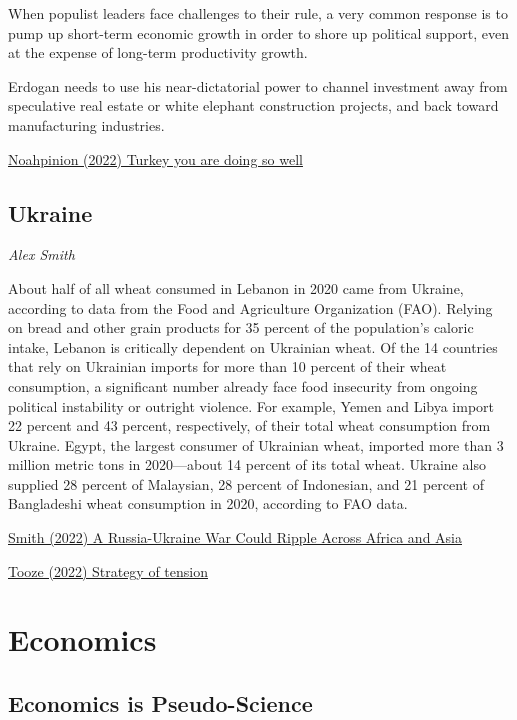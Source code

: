 \documentclass[
]{book}
\begin{document}
When populist leaders face challenges to their rule, a very common response is to pump up short-term economic growth in order to shore up political support, even at the expense of long-term productivity growth.

Erdogan needs to use his near-dictatorial power to channel investment away from speculative real estate or white elephant construction projects, and back toward manufacturing industries.

\href{https://noahpinion.substack.com/p/turkey-you-were-doing-so-well}{Noahpinion (2022) Turkey you are doing so well}

\hypertarget{ukraine}{%
\section{Ukraine}\label{ukraine}}

\emph{Alex Smith}

About half of all wheat consumed in Lebanon in 2020 came from Ukraine, according to data from the Food and Agriculture Organization (FAO). Relying on bread and other grain products for 35 percent of the population's caloric intake, Lebanon is critically dependent on Ukrainian wheat. Of the 14 countries that rely on Ukrainian imports for more than 10 percent of their wheat consumption, a significant number already face food insecurity from ongoing political instability or outright violence. For example, Yemen and Libya import 22 percent and 43 percent, respectively, of their total wheat consumption from Ukraine. Egypt, the largest consumer of Ukrainian wheat, imported more than 3 million metric tons in 2020---about 14 percent of its total wheat. Ukraine also supplied 28 percent of Malaysian, 28 percent of Indonesian, and 21 percent of Bangladeshi wheat consumption in 2020, according to FAO data.

\href{https://foreignpolicy.com/2022/01/22/russia-ukraine-war-grain-exports-africa-asia/}{Smith (2022) A Russia-Ukraine War Could Ripple Across Africa and Asia}

\href{https://adamtooze.substack.com/p/chartbook-76-strategy-of-tension}{Tooze (2022) Strategy of tension}

\hypertarget{economics-1}{%
\chapter{Economics}\label{economics-1}}

\hypertarget{economics-is-pseudo-science}{%
\section{Economics is Pseudo-Science}\label{economics-is-pseudo-science}}
\end{document}
